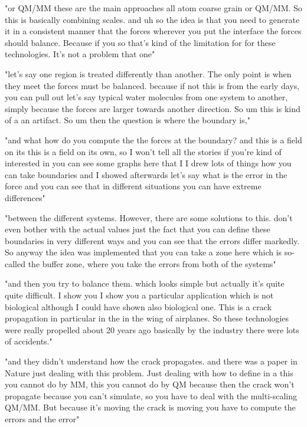 "or QM/MM these are the main approaches all atom coarse grain or QM/MM. So this is basically combining scales. and uh so the idea is that you need to generate it in a consistent manner that the forces wherever you put the interface the forces should balance. Because if you so that's kind of the limitation for for these technologies. It's not a problem that one"


"let's say one region is treated differently than another. The only point is when they meet the forces must be balanced. because if not this is from the early days, you can pull out let's say typical water molecules from one system to another, simply because the forces are larger towards another direction. So um this is kind of a an artifact. So um then the question is where the boundary is,"


"and what how do you compute the the forces at the boundary? and this is a field on its this is a field on its own, so I won't tell all the stories if you're kind of interested in you can see some graphs here that I I drew lots of things how you can take boundaries and I showed afterwards let's say what is the error in the force and you can see that in different situations you can have extreme differences"


"between the different systems. However, there are some solutions to this. don't even bother with the actual values just the fact that you can define these boundaries in very different ways and you can see that the errors differ markedly. So anyway the idea was implemented that you can take a zone here which is so-called the buffer zone, where you take the errors from both of the systems"

"and then you try to balance them. which looks simple but actually it's quite quite difficult. I show you I show you a particular application which is not biological although I could have shown also biological one. This is a crack propagation in particular in the in the wing of airplanes. So these technologies were really propelled about 20 years ago basically by the industry there were lots of accidents."


"and they didn't understand how the crack propagates. and there was a paper in Nature just dealing with this problem. Just dealing with how to define in a this you cannot do by MM, this you cannot do by QM because then the crack won't propagate because you can't simulate, so you have to deal with the multi-scaling QM/MM. But because it's moving the crack is moving you have to compute the errors and the error"


